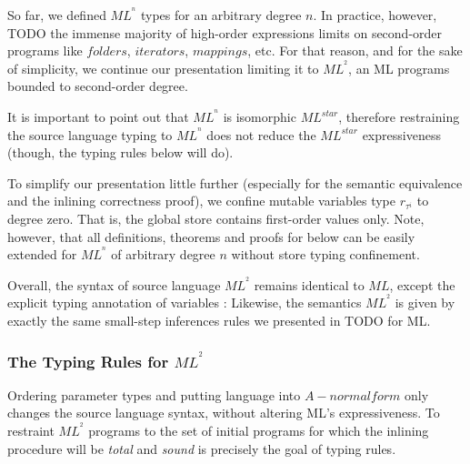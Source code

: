 \documentclass[a4paper,11pt,oneside]{article}
\theoremstyle{plain}
\newcommand{\bwedge}{\boldsymbol{~\wedge~}}
\newcommand{\inlsrc}{\textit{ML}^{^2}}
\newcommand{\inlT}{\inlsrc}
\begin{document}
So far, we defined $ML^{^{n}}$ types for an arbitrary degree $n$. In
practice, however, TODO the immense majority of high-order expressions
limits on second-order programs like $folders$, $iterators$, $mappings$,
etc.  For that reason, and for the sake of simplicity, we continue our
presentation limiting it to $ML^{^{2}}$, an ML programs bounded to
second-order degree.

It is important to point out that $ML^{^{n}}$ is isomorphic $ML^{star}$,
therefore restraining the source language typing to $ML^{^{n}}$ does not
reduce the $ML^{star}$ expressiveness (though, the typing rules below will
do).

To simplify our presentation little further (especially for the semantic
equivalence and the inlining correctness proof), we confine mutable
variables type $r_{\tau^i}$ to degree zero.  That is, the global store
contains first-order values only.  Note, however, that all definitions,
theorems and proofs for below can be easily extended for $ML^{^{n}}$ of
arbitrary degree $n$ without store typing confinement.

Overall, the syntax of source language $\inlT$ remains  identical to $ML$, 
except the explicit typing annotation of variables :
Likewise, the semantics $\inlsrc$ is given by exactly the same small-step 
inferences rules we presented in TODO for ML.

\subsubsection{The Typing Rules for \texorpdfstring{$ML^{^{2}}$}{}}

Ordering parameter types and putting language into $A-normal form$ only
changes the source language syntax, without altering ML's expressiveness. To
restraint $\inlsrc$ programs to the set of initial programs for which the
inlining procedure will be \textit{total} and \textit{sound} is precisely
the goal of typing rules.
 
\end{document}
